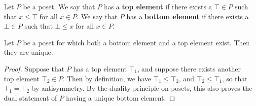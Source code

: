 \begin{definition}
  Let $P$ be a poset. We say that $P$ has a \textbf{top element} if
  there exists a $\top \in P$ such that $x \leq \top $ for all $x \in
  P$. We say that $P$ has a \textbf{bottom element} if there exists a
  $\bot \in P$ such that $\bot \leq x$ for all $x \in P$.
\end{definition}

\begin{lemma}\label{lemma_1.4.4}
  Let $P$ be a poset for which both a bottom element and a top element
  exist. Then they are unique.
\end{lemma}
\begin{proof}
  Suppose that $P$ has a top element $\top_1$, and suppose there
  exists another top element $\top_2 \in P$. Then by definition, we
  have $\top_1 \leq \top_2$, and $\top_2 \leq \top_1$, so that
  $\top_1=\top_2$ by antisymmetry. By the duality principle on posets,
  this also proves the dual statement of $P$ having a unique bottom
  element.
\end{proof}

